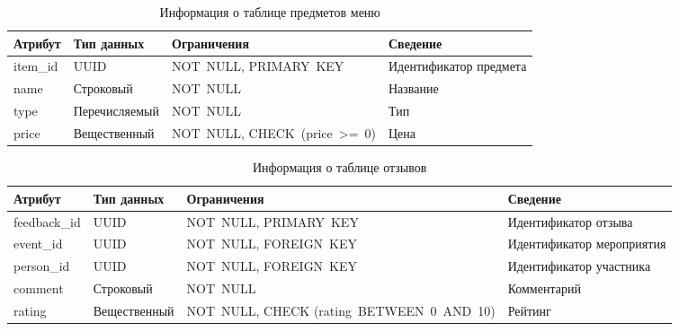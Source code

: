 \begin{table}[h!]
	\centering
	\caption{Информация о таблице предметов меню}
	\begin{tabularx}{\textwidth}{|p{2.6cm}|X|p{6cm}|X|}
		\hline
		\textbf{Атрибут} & \textbf{Тип данных} & \textbf{Ограничения} & \textbf{Сведение} \\
		\hline
		item\_id & UUID & NOT~NULL, \newline PRIMARY~KEY & Идентификатор предмета \\
		\hline
		name & Строковый & NOT~NULL & Название \\
		\hline
		type & Перечисляемый & NOT~NULL & Тип \\
		\hline
		price & Вещественный & NOT~NULL, \newline CHECK~(price~>=~0) & Цена \\
		\hline
	\end{tabularx}
	\label{tbl:items}
\end{table}

\begin{table}[h!]
	\centering
	\caption{Информация о таблице отзывов}
	\begin{tabularx}{\textwidth}{|p{2.6cm}|X|p{6cm}|X|}
		\hline
		\textbf{Атрибут} & \textbf{Тип данных} & \textbf{Ограничения} & \textbf{Сведение} \\
		\hline
		feedback\_id & UUID & NOT~NULL, \newline PRIMARY~KEY & Идентификатор отзыва \\
		\hline
		event\_id & UUID & NOT~NULL, \newline FOREIGN~KEY & Идентификатор мероприятия \\
		\hline
		person\_id & UUID & NOT~NULL, \newline FOREIGN~KEY & Идентификатор участника \\
		\hline
		comment & Строковый & NOT~NULL & Комментарий \\
		\hline
		rating & Вещественный & NOT~NULL, \newline CHECK (rating~BETWEEN~0~AND~10) & Рейтинг \\
		\hline
	\end{tabularx}
	\label{tbl:feedbacks}
\end{table}

